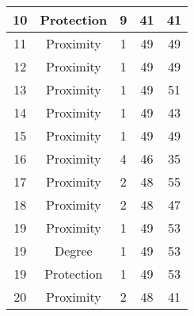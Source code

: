 \documentclass[results.tex]{subfiles}
\begin{document}
\begin{center}
\begin{tabular}{| c || c | c | c | c |}
            \hline
            10                      & Protection                   & 9                      & 41                      & 41                   \\
            \hline
            11                      & Proximity                    & 1                      & 49                      & 49                   \\
            \hline
            12                      & Proximity                    & 1                      & 49                      & 49                   \\
            \hline
            13                      & Proximity                    & 1                      & 49                      & 51                   \\
            \hline
            14                      & Proximity                    & 1                      & 49                      & 43                   \\
            \hline
            15                      & Proximity                    & 1                      & 49                      & 49                   \\
            \hline
            16                      & Proximity                    & 4                      & 46                      & 35                   \\
            \hline
            17                      & Proximity                    & 2                      & 48                      & 55                   \\
            \hline
            18                      & Proximity                    & 2                      & 48                      & 47                   \\
            \hline
            19                      & Proximity                    & 1                      & 49                      & 53                   \\
            \hline
            19                      & Degree                       & 1                      & 49                      & 53                   \\
            \hline
            19                      & Protection                   & 1                      & 49                      & 53                   \\
            \hline
            20                      & Proximity                    & 2                      & 48                      & 41                   \\

\end{tabular}
\end{center}
\end{document}

